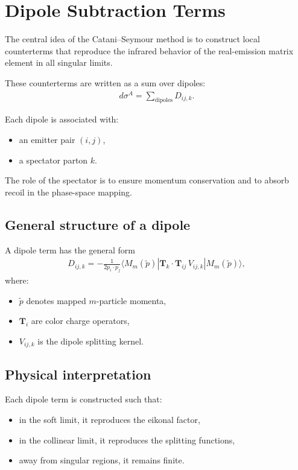 \section{Dipole Subtraction Terms}

The central idea of the Catani--Seymour method is to construct
local counterterms that reproduce the infrared behavior of the
real-emission matrix element in all singular limits.

These counterterms are written as a sum over dipoles:
\begin{align}
d\sigma^A = \sum_{\text{dipoles}} D_{ij,k}.
\end{align}

Each dipole is associated with:
\begin{itemize}
    \item an emitter pair $(i,j)$,
    \item a spectator parton $k$.
\end{itemize}

The role of the spectator is to ensure momentum conservation
and to absorb recoil in the phase-space mapping.

\subsection{General structure of a dipole}

A dipole term has the general form
\begin{align}
D_{ij,k} =
-\frac{1}{2 p_i \cdot p_j}
\langle M_m(\tilde{p}) |
\mathbf{T}_k \cdot \mathbf{T}_{ij}
\, V_{ij,k}
| M_m(\tilde{p}) \rangle,
\end{align}
where:
\begin{itemize}
    \item $\tilde{p}$ denotes mapped $m$-particle momenta,
    \item $\mathbf{T}_i$ are color charge operators,
    \item $V_{ij,k}$ is the dipole splitting kernel.
\end{itemize}

\subsection{Physical interpretation}

Each dipole term is constructed such that:
\begin{itemize}
    \item in the soft limit, it reproduces the eikonal factor,
    \item in the collinear limit, it reproduces the splitting functions,
    \item away from singular regions, it remains finite.
\end{itemize}

